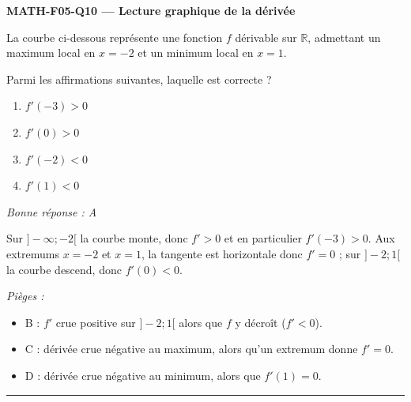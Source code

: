 \documentclass[11pt,a4paper]{article}
\newcommand{\R}{\mathbb{R}}\newcommand{\N}{\mathbb{N}}\newcommand{\Z}{\mathbb{Z}}
\begin{document}
\noindent\textbf{MATH-F05-Q10 --- Lecture graphique de la dérivée}\par
La courbe ci-dessous représente une fonction $f$ dérivable sur $\R$, admettant un maximum local en $x=-2$ et un minimum local en $x=1$.
\begin{center}
\end{center}
Parmi les affirmations suivantes, laquelle est correcte ?
\begin{enumerate}[label=\Alph*)]
\item $f'(-3)>0$
\item $f'(0)>0$
\item $f'(-2)<0$
\item $f'(1)<0$
\end{enumerate}
\textit{Bonne réponse : A}\par
Sur $]-\infty;-2[$ la courbe monte, donc $f'>0$ et en particulier $f'(-3)>0$. Aux extremums $x=-2$ et $x=1$, la tangente est horizontale donc $f'=0$ ; sur $]-2;1[$ la courbe descend, donc $f'(0)<0$.\par
\textit{Pièges :}
\begin{itemize}
\item B : $f'$ crue positive sur $]-2;1[$ alors que $f$ y décroît ($f'<0$).
\item C : dérivée crue négative au maximum, alors qu'un extremum donne $f'=0$.
\item D : dérivée crue négative au minimum, alors que $f'(1)=0$.
\end{itemize}
\vspace{8pt}\hrule\vspace{8pt}
\end{document}
